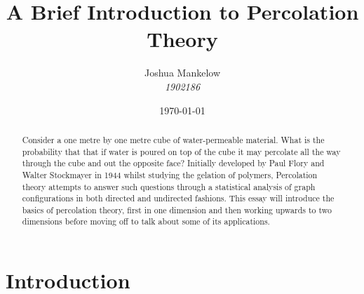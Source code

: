 \documentclass[a4paper,11pt]{article}
\title{\textbf{ A Brief Introduction to Percolation Theory }}
\author{Joshua Mankelow \\ \textit{1902186}}
\date{\today}
\theoremstyle{plain} %
\theoremstyle{definition} %
\theoremstyle{remark} %
\begin{document}
  
\maketitle

\newpage

\begin{abstract}
  Consider a one metre by one metre cube of water-permeable material. What is the probability that that if water is poured on top of the cube it may percolate all the way through
  the cube and out the opposite face? Initially developed by Paul Flory and Walter Stockmayer in 1944 whilst studying the gelation of polymers, Percolation theory attempts to answer such questions through a statistical analysis of graph configurations in both directed and undirected
  fashions. This essay will introduce the basics of percolation theory, first in one dimension and then working upwards to two dimensions before moving off to talk about some of
  its applications.
\end{abstract}

\newpage

\tableofcontents

\newpage

\section{Introduction}
\end{document}
